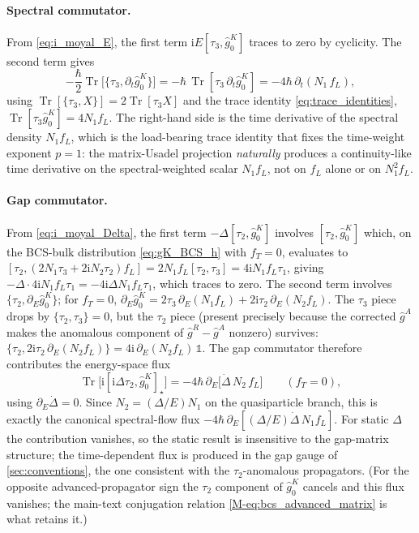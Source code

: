 \documentclass[
  aps,
  prb,
  preprint,
  superscriptaddress,
  longbibliography,
  nofootinbib
]{revtex4-2}
\newcommand{\ii}{\mathrm{i}}
\newcommand{\Tr}{\operatorname{Tr}}
\newcommand{\DOS}{N_1}
\newcommand{\fL}{f_L}
\newcommand{\fT}{f_T}
\newcommand{\hatg}{\hat{g}}
\providecommand{\openone}{}\renewcommand{\openone}{\mathds{1}}
\begin{document}
\paragraph{Spectral commutator.} From \cref{eq:i_moyal_E}, the first
term \(\ii E[\tau_3,\hatg_0^{K}]\) traces to zero by cyclicity. The
second term gives
\begin{equation}
  -\frac{\hbar}{2}\Tr\bigl[\{\tau_3,\partial_t\hatg_0^{K}\}\bigr]
  =
  -\hbar\,\Tr[\tau_3\,\partial_t\hatg_0^{K}]
  =
  -4\hbar\,\partial_t(\DOS\,\fL),
  \label{eq:trace_time_deriv}
\end{equation}
using \(\Tr[\{\tau_3,X\}]=2\Tr[\tau_3 X]\) and the trace identity
\cref{eq:trace_identities}, \(\Tr[\tau_3\hatg_0^{K}]=4\DOS\fL\). The
right-hand side is the time derivative of the spectral density
\(\DOS\fL\), which is the load-bearing trace identity that fixes the
time-weight exponent \(p=1\): the matrix-Usadel projection
\emph{naturally} produces a continuity-like time derivative on the
spectral-weighted scalar \(\DOS\fL\), not on \(\fL\) alone or on
\(\DOS^2\fL\).

\paragraph{Gap commutator.} From \cref{eq:i_moyal_Delta}, the first
term \(-\Delta[\tau_2,\hatg_0^{K}]\) involves
\([\tau_2,\hatg_0^{K}]\) which, on the BCS-bulk distribution
\cref{eq:gK_BCS_h} with \(\fT=0\), evaluates to
\([\tau_2,(2\DOS\tau_3+2\ii N_2\tau_2)\fL]=2\DOS\fL[\tau_2,\tau_3]
=4\ii\DOS\fL\tau_1\),
giving \(-\Delta\cdot 4\ii\DOS\fL\tau_1=-4\ii\Delta\DOS\fL\tau_1\),
which traces to zero. The second term involves
\(\{\tau_2,\partial_E\hatg_0^{K}\}\); for \(\fT=0\),
\(\partial_E\hatg_0^{K}
=2\tau_3\,\partial_E(\DOS\fL)+2\ii\tau_2\,\partial_E(N_2\fL)\). The
\(\tau_3\) piece drops by \(\{\tau_2,\tau_3\}=0\), but the \(\tau_2\)
piece (present precisely because the corrected \(\hatg^A\) makes the
anomalous component of \(\hatg^R-\hatg^A\) nonzero) survives:
\(\{\tau_2,2\ii\tau_2\,\partial_E(N_2\fL)\}=4\ii\,\partial_E(N_2\fL)\,\openone\).
The gap commutator therefore contributes the energy-space flux
\begin{equation}
  \Tr\bigl[\ii[\ii\Delta\tau_2,\hatg_0^{K}]_{\star}\bigr]
  =
  -4\hbar\,\partial_E\!\bigl[\dot\Delta\,N_2\,\fL\bigr]
  \qquad
  (\fT=0),
  \label{eq:trace_gap}
\end{equation}
using \(\partial_E\dot\Delta=0\). Since
\(N_2=(\Delta/E)\DOS\) on the quasiparticle branch, this is exactly the
canonical spectral-flow flux
\(-4\hbar\,\partial_E[(\Delta/E)\dot\Delta\,\DOS\fL]\). For static
\(\Delta\) the contribution vanishes, so the static result is insensitive
to the gap-matrix structure; the time-dependent flux is produced in the
gap gauge of \cref{sec:conventions}, the one consistent with the
\(\tau_2\)-anomalous propagators. (For the opposite advanced-propagator
sign the \(\tau_2\) component of \(\hatg_0^K\) cancels and this flux
vanishes; the main-text conjugation relation \cref{M-eq:bcs_advanced_matrix} is what
retains it.)
\end{document}

